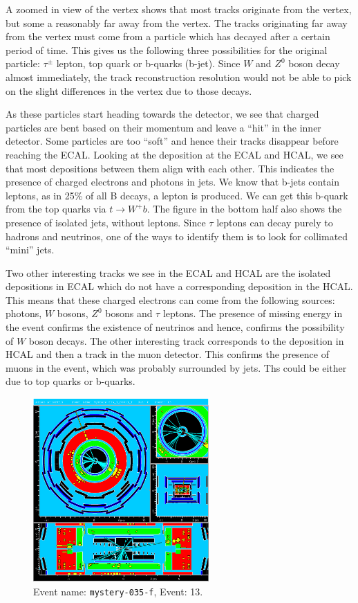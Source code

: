 \documentclass[a4paper]{report}
\numberwithin{equation}{section}
\begin{document}
A zoomed in view of the vertex shows that most tracks originate from the vertex, but some a reasonably far away from the vertex. The tracks originating far away from the vertex must come from a particle which has decayed after a certain period of time. This gives us the following three possibilities for the original particle: $\tau^{\pm}$ lepton, top quark or b-quarks (b-jet). Since $W$ and $Z^0$ boson decay almost immediately, the track reconstruction resolution would not be able to pick on the slight differences in the vertex due to those decays. 

As these particles start heading towards the detector, we see that charged particles are bent based on their momentum and leave a ``hit'' in the inner detector. Some particles are too ``soft'' and hence their tracks disappear before reaching the ECAL. Looking at the deposition at the ECAL and HCAL, we see that most depositions between them align with each other. This indicates the presence of charged electrons and photons in jets. We know that b-jets contain leptons, as in 25\% of all B decays, a lepton is produced. We can get this b-quark from the top quarks via $t \rightarrow W^+ b$. The figure in the bottom half also shows the presence of isolated jets, without leptons. Since $\tau$ leptons can decay purely to hadrons and neutrinos, one of the ways to identify them is to look for collimated ``mini'' jets. 
 
Two other interesting tracks we see in the ECAL and HCAL are the isolated depositions in ECAL which do not have a corresponding deposition in the HCAL. This means that these charged electrons can come from the following sources: photons, $W$ bosons, $Z^0$ bosons and $\tau$ leptons. The presence of missing energy in the event confirms the existence of neutrinos and hence, confirms the possibility of $W$ boson decays. The other interesting track corresponds to the deposition in HCAL and then a track in the muon detector. This confirms the presence of muons in the event, which was probably surrounded by jets. Ths could be either due to top quarks or b-quarks. 

\begin{figure}[htpb]
    \centering
    \includegraphics[width=0.6\textwidth]{mystery-035_0_00013_f-YX-RZ-RZ-YX-2022-05-23-13-28-39}
    \caption{Event name: \texttt{mystery-035-f}, Event: 13.}
    \label{fig:mys1}
\end{figure}
\end{document}
